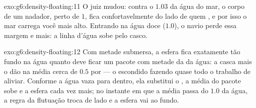 \begin{solution}{exo:g6:density-floating:11}
O juiz mudou: contra o $1.03$ da água do mar, o corpo de um nadador,
perto de $1$, fica confortavelmente do lado de quem , e por
isso o mar carrega você mais alto. Entrando na água doce ($1.0$), o
navio perde essa margem e  mais: a linha d'água sobe pelo
casco.
\end{solution}

\begin{solution}{exo:g6:density-floating:12}
Com metade submersa, a esfera fica exatamente tão fundo na água
quanto deve ficar um pacote com metade da  da água: a casca
mais o  dão na média cerca de $0.5$  por  ---
o  escondido fazendo quase todo o trabalho de aliviar. Conforme a
água vaza para dentro, ela substitui o , a  média do
pacote sobe e a esfera  cada vez mais; no instante em que a
média passa do $1.0$ da água, a regra da flutuação troca de lado e a
esfera vai ao fundo.
\end{solution}

